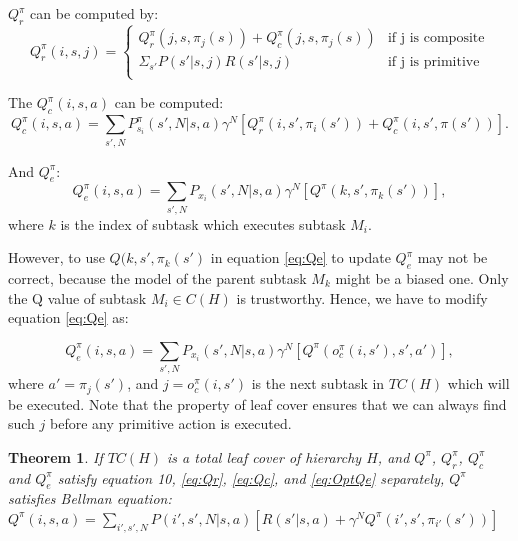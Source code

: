 \documentclass{article} %
\newtheorem{theorem}{Theorem}
\begin{document}


$Q_r^{\pi}$ can be computed by:
\begin{equation}
    Q_r^{\pi}(i, s, j) = 
    \left\{\begin{array}{ll}
        Q_r^{\pi}(j, s, \pi_j(s)) + Q_c^{\pi}(j, s, \pi_j(s))& \mbox{if j is composite} \\
        \Sigma_{s'} P(s'|s, j)R(s'|s, j) & \mbox{if j is primitive} \\  
    \end{array} \right.
    \label{eq:Qr}
\end{equation}

The $Q_c^{\pi}(i, s, a)$ can be computed:
\begin{equation}
    Q_c^{\pi}(i, s, a) = \sum_{s', N} P_{s_i}^{\pi}(s', N|s, a)\gamma^N[Q_r^{\pi}(i, s', \pi_i(s')) + Q_c^{\pi}(i, s', \pi(s'))].
    \label{eq:Qc}
\end{equation}


And $Q_e^{\pi}$:
\begin{equation}
    Q_e^{\pi}(i, s, a) = \sum_{s', N} P_{x_i}(s', N|s, a)\gamma^N[Q^{\pi}(k, s', \pi_k(s'))],
    \label{eq:Qe}
\end{equation}
where $k$ is the index of subtask which executes subtask $M_i$.

However, to use $Q(k, s', \pi_k(s')$ in equation \ref{eq:Qe} to update $Q_e^{\pi}$ may not be correct, because the model
of the parent subtask $M_k$ might be a biased one. Only the Q value of subtask $M_i \in C(H)$ is trustworthy.
Hence, we have to modify equation \ref{eq:Qe} as:

\begin{equation}
    Q_e^{\pi}(i, s, a) = \sum_{s', N} P_{x_i}(s', N|s, a)\gamma^N[Q^{\pi}(o_c^{\pi}(i, s'), s', a')],
    \label{eq:OptQe}
\end{equation}
where $a' = \pi_j(s')$, and $j = o_c^{\pi}(i, s')$ is the next subtask in $TC(H)$ which will be executed. 
Note that the property of leaf cover ensures that we can always find such $j$ before any primitive
action is executed. %



\begin{theorem}
    If $TC(H)$ is a total leaf cover of hierarchy $H$, and $Q^{\pi}$, $Q_r^{\pi}$, $Q_c^{\pi}$ and $Q_e^{\pi}$ satisfy equation
    10, 
    \ref{eq:Qr}, \ref{eq:Qc}, and \ref{eq:OptQe} separately, $Q^{\pi}$ satisfies Bellman equation:
    $Q^{\pi}(i, s, a) = \sum_{i', s', N}P(i', s', N|s, a)[R(s'|s, a) + \gamma^N Q^{\pi}(i', s', \pi_{i'}(s'))]$
\end{theorem}
\end{document}
